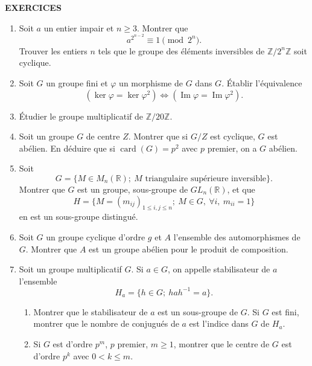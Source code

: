 
\begin{center}
{\Large\sffamily\bfseries\color{BellaLavenderDeep} EXERCICES}
\end{center}
\vspace{0.8em}

\begin{enumerate}[label=\arabic*.,leftmargin=2.2em,itemsep=1.1em]
\item Soit $a$ un entier impair et $n\ge3$. Montrer que
\[
a^{2^{n-2}}\equiv1\pmod{2^n}.
\]
Trouver les entiers $n$ tels que le groupe des éléments inversibles de $\mathbb Z/2^n\mathbb Z$ soit cyclique.

\item Soit $G$ un groupe fini et $\varphi$ un morphisme de $G$ dans $G$. Établir l'équivalence
\[
(\ker\varphi=\ker\varphi^2)\Longleftrightarrow(\operatorname{Im}\varphi=\operatorname{Im}\varphi^2).
\]

\item Étudier le groupe multiplicatif de $\mathbb Z/20\mathbb Z$.

\item Soit un groupe $G$ de centre $Z$. Montrer que si $G/Z$ est cyclique, $G$ est abélien. En déduire que si $\operatorname{card}(G)=p^2$ avec $p$ premier, on a $G$ abélien.

\item Soit
\[
G=\{M\in M_n(\mathbb R);\ M\text{ triangulaire supérieure inversible}\}.
\]
Montrer que $G$ est un groupe, sous-groupe de $GL_n(\mathbb R)$, et que
\[
H=\{M=(m_{ij})_{1\le i,j\le n};\ M\in G,\ \forall i,\ m_{ii}=1\}
\]
en est un sous-groupe distingué.

\item Soit $G$ un groupe cyclique d'ordre $g$ et $A$ l'ensemble des automorphismes de $G$. Montrer que $A$ est un groupe abélien pour le produit de composition.

\item Soit un groupe multiplicatif $G$. Si $a\in G$, on appelle stabilisateur de $a$ l'ensemble
\[
H_a=\{h\in G;\ hah^{-1}=a\}.
\]
\begin{enumerate}[label=\arabic*),leftmargin=2em]
\item Montrer que le stabilisateur de $a$ est un sous-groupe de $G$. Si $G$ est fini, montrer que le nombre de conjugués de $a$ est l'indice dans $G$ de $H_a$.
\item Si $G$ est d'ordre $p^m$, $p$ premier, $m\ge1$, montrer que le centre de $G$ est d'ordre $p^k$ avec $0<k\le m$.
\end{enumerate}


\end{enumerate}
